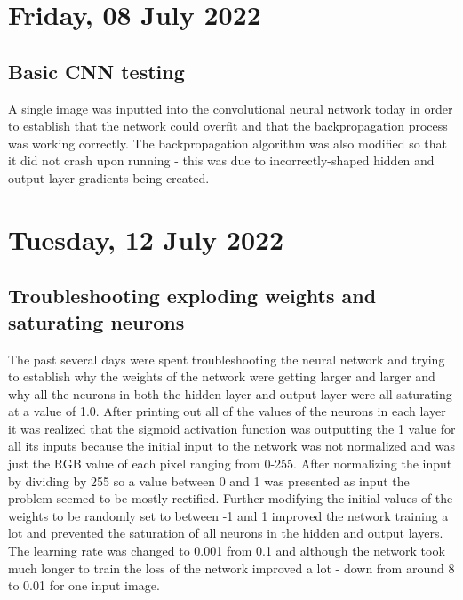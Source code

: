 \section[2022/07/08]{Friday, 08 July 2022}

\subsection{Basic CNN testing}

A single image was inputted into the convolutional neural network today in order to establish that the network could overfit and that the backpropagation process was working correctly. The backpropagation algorithm was also modified so that it did not crash upon running - this was due to incorrectly-shaped hidden and output layer gradients being created.

\section[2022/07/12]{Tuesday, 12 July 2022}

\subsection{Troubleshooting exploding weights and saturating neurons}

The past several days were spent troubleshooting the neural network and trying to establish why the weights of the network were getting larger and larger and why all the neurons in both the hidden layer and output layer were all saturating at a value of 1.0. After printing out all of the values of the neurons in each layer it was realized that the sigmoid activation function was outputting the 1 value for all its inputs because the initial input to the network was not normalized and was just the RGB value of each pixel ranging from 0-255. After normalizing the input by dividing by 255 so a value between 0 and 1 was presented as input the problem seemed to be mostly rectified. Further modifying the initial values of the weights to be randomly set to between -1 and 1 improved the network training a lot and prevented the saturation of all neurons in the hidden and output layers. The learning rate was changed to 0.001 from 0.1 and although the network took much longer to train the loss of the network improved a lot - down from around 8 to 0.01 for one input image. \\

